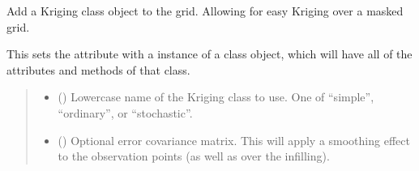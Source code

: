 \documentclass[letterpaper,10pt,english]{sphinxmanual}
\begin{document}
\begin{fulllineitems}
\begin{fulllineitems}
\end{fulllineitems}


\begin{fulllineitems}
\label{\detokenize{grid:glomar_gridding.grid.Grid.kriging}}
\pysigstartsignatures
\pysiglinewithargsret
{}
{\sphinxparamcomma {}}
{}
\pysigstopsignatures
\sphinxAtStartPar
Add a Kriging class object to the grid. Allowing for easy Kriging over
a masked grid.

\sphinxAtStartPar
This sets the  attribute with a instance of a
 class object, which will have
all of the attributes and methods of that class.
\begin{quote}\begin{description}
\begin{itemize}
\item {}
\sphinxAtStartPar
{} () \textendash{} Lower\sphinxhyphen{}case name of the Kriging class to use. One of “simple”,
“ordinary”, or “stochastic”.

\item {}
\sphinxAtStartPar
{} (\sphinxstyleliteralemphasis{\sphinxupquote{ | }}\sphinxstyleliteralemphasis{\sphinxupquote{ | }}) \textendash{} Optional error covariance matrix. This will apply a smoothing
effect to the observation points (as well as over the infilling).

\end{itemize}

\sphinxAtStartPar
{}

\end{description}\end{quote}

\end{fulllineitems}


\end{fulllineitems}
\end{document}
